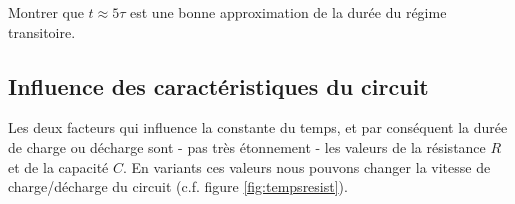 \documentclass[11pt,a4paper]{article}
\begin{document}
\begin{exo} %
Montrer que $t\approx5\tau$ est une bonne approximation de la durée du régime transitoire. 
\vspace{3cm}
\end{exo} 

\subsection{Influence des caractéristiques du circuit} 

Les deux facteurs qui influence la constante du temps, et par conséquent la durée de charge ou décharge sont - pas très étonnement - les valeurs de la résistance $R$ et de la capacité $C$. En variants ces valeurs nous pouvons changer la vitesse de charge/décharge du circuit (c.f. figure \ref{fig:tempsresist}). 
\end{document}
